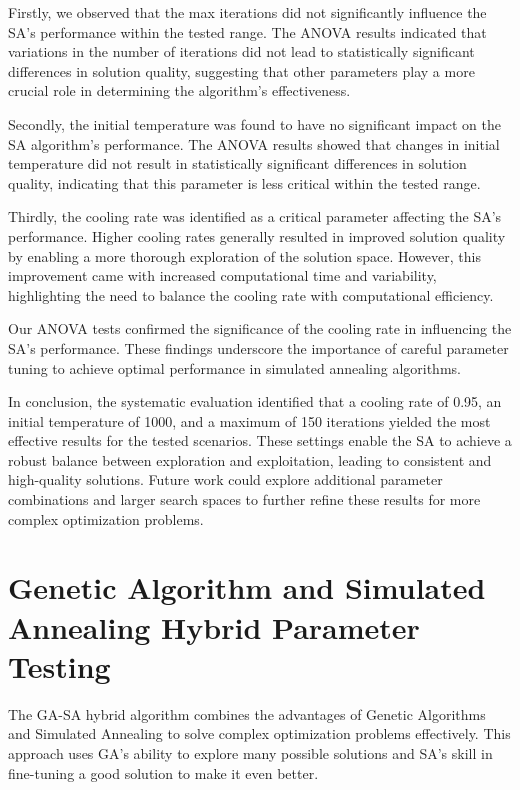 \documentclass{article}
\begin{document}
    Firstly, we observed that the max iterations did not significantly influence the SA's performance within the tested range. The ANOVA results indicated that variations in the number of iterations did not lead to statistically significant differences in solution quality, suggesting that other parameters play a more crucial role in determining the algorithm's effectiveness.

    Secondly, the initial temperature was found to have no significant impact on the SA algorithm's performance. The ANOVA results showed that changes in initial temperature did not result in statistically significant differences in solution quality, indicating that this parameter is less critical within the tested range.

    Thirdly, the cooling rate was identified as a critical parameter affecting the SA’s performance. Higher cooling rates generally resulted in improved solution quality by enabling a more thorough exploration of the solution space. However, this improvement came with increased computational time and variability, highlighting the need to balance the cooling rate with computational efficiency.

    Our ANOVA tests confirmed the significance of the cooling rate in influencing the SA’s performance. These findings underscore the importance of careful parameter tuning to achieve optimal performance in simulated annealing algorithms.

    In conclusion, the systematic evaluation identified that a cooling rate of 0.95, an initial temperature of 1000, and a maximum of 150 iterations yielded the most effective results for the tested scenarios. These settings enable the SA to achieve a robust balance between exploration and exploitation, leading to consistent and high-quality solutions. Future work could explore additional parameter combinations and larger search spaces to further refine these results for more complex optimization problems.

    \newpage


    \section{Genetic Algorithm and Simulated Annealing Hybrid Parameter Testing}\label{subsec:genetic-algorithm-and-simulated-annealing-hybrid-parameter-testing}

    The GA-SA hybrid algorithm combines the advantages of Genetic Algorithms and Simulated Annealing to solve complex optimization problems effectively. This approach uses GA's ability to explore many possible solutions and SA's skill in fine-tuning a good solution to make it even better.
\end{document}
